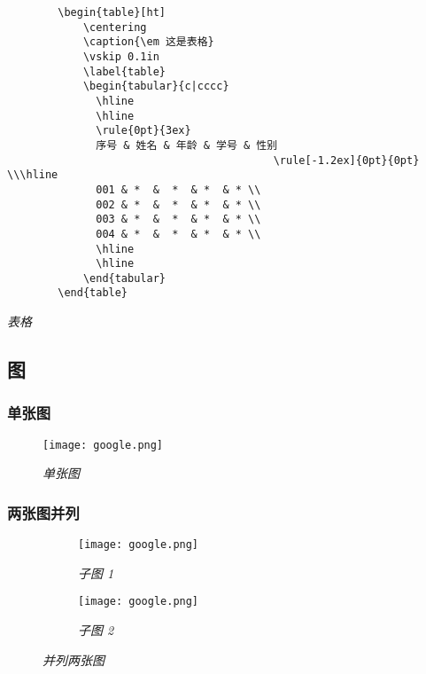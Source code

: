 \documentclass[a4paper, 12pt, UTF8]{ctexart}
\begin{document}
\begin{listing}[ht]
    \begin{verbatim}
        \begin{table}[ht]
            \centering
            \caption{\em 这是表格}
            \vskip 0.1in
            \label{table}
            \begin{tabular}{c|cccc}
              \hline
              \hline
              \rule{0pt}{3ex}
              序号 & 姓名 & 年龄 & 学号 & 性别  
                                          \rule[-1.2ex]{0pt}{0pt} \\\hline
              001 & *  &  *  & *  & * \\ 
              002 & *  &  *  & *  & * \\
              003 & *  &  *  & *  & * \\      
              004 & *  &  *  & *  & * \\
              \hline
              \hline 
            \end{tabular}
        \end{table}
    \end{verbatim}
    \caption{\em 表格}
    \label{table}
\end{listing}

\clearpage
\subsection{图}

\subsubsection{单张图}
\begin{figure}[H]
    \centering \texttt{[image: google.png]}
    \caption{\em 单张图}
    \label{fig:mesh}
\end{figure}

\subsubsection{两张图并列}
\begin{figure}[H]
    \centering
    \begin{subfigure}{.48\textwidth}
        \centering
        \texttt{[image: google.png]}
        \caption{\em 子图 1}
        \label{fig:v21}
    \end{subfigure}
    \begin{subfigure}{.48\textwidth}
        \centering
        \texttt{[image: google.png]}
        \caption{\em 子图 2}
        \label{fig:v22}
    \end{subfigure}
    \caption{\em 并列两张图}
    \label{fig:v2}
\end{figure}
\end{document}
